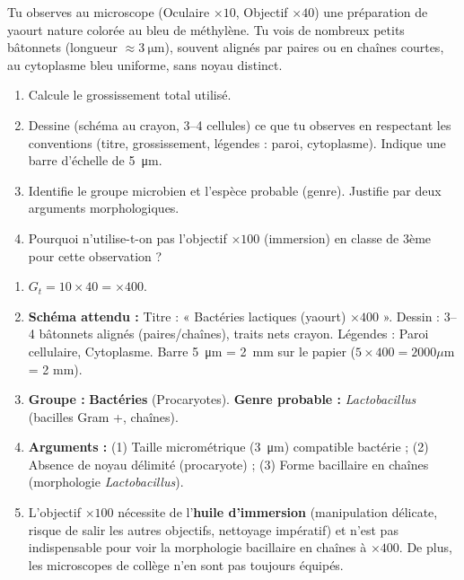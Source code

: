 \documentclass[11pt]{article}
\begin{document}
\begin{exercice}
Tu observes au microscope (Oculaire $\times 10$, Objectif $\times 40$) une préparation de yaourt nature colorée au bleu de méthylène. Tu vois de nombreux petits bâtonnets (longueur $\approx \SI{3}{\micro\meter}$), souvent alignés par paires ou en chaînes courtes, au cytoplasme bleu uniforme, sans noyau distinct.
\begin{enumerate}
    \item Calcule le grossissement total utilisé.
    \item Dessine (schéma au crayon, 3--4 cellules) ce que tu observes en respectant les conventions (titre, grossissement, légendes : paroi, cytoplasme). Indique une barre d'échelle de \SI{5}{\micro\meter}.
    \item Identifie le groupe microbien et l'espèce probable (genre). Justifie par deux arguments morphologiques.
    \item Pourquoi n'utilise-t-on pas l'objectif $\times 100$ (immersion) en classe de 3ème pour cette observation ?
\end{enumerate}
\end{exercice}

\begin{corrige}[Exercice n°1]
\begin{enumerate}
    \item $G_t = 10 \times 40 = \textbf{$\times 400$}$.
    \item \textbf{Schéma attendu :} Titre : « Bactéries lactiques (yaourt) $\times 400$ ». Dessin : 3--4 bâtonnets alignés (paires/chaînes), traits nets crayon. Légendes : Paroi cellulaire, Cytoplasme. Barre \SI{5}{\micro\meter} = \SI{2}{\milli\meter} sur le papier ($5 \times 400 = 2000 \mu$m = 2 mm).
    \item \textbf{Groupe :} \textbf{Bactéries} (Procaryotes). \textbf{Genre probable :} \emph{Lactobacillus} (bacilles Gram +, chaînes).
    \item \textbf{Arguments :} (1) Taille micrométrique (\SI{3}{\micro\meter}) compatible bactérie ; (2) Absence de noyau délimité (procaryote) ; (3) Forme bacillaire en chaînes (morphologie \emph{Lactobacillus}).
    \item L'objectif $\times 100$ nécessite de l'\textbf{huile d'immersion} (manipulation délicate, risque de salir les autres objectifs, nettoyage impératif) et n'est pas indispensable pour voir la morphologie bacillaire en chaînes à $\times 400$. De plus, les microscopes de collège n'en sont pas toujours équipés.
\end{enumerate}
\end{corrige}
\end{document}
